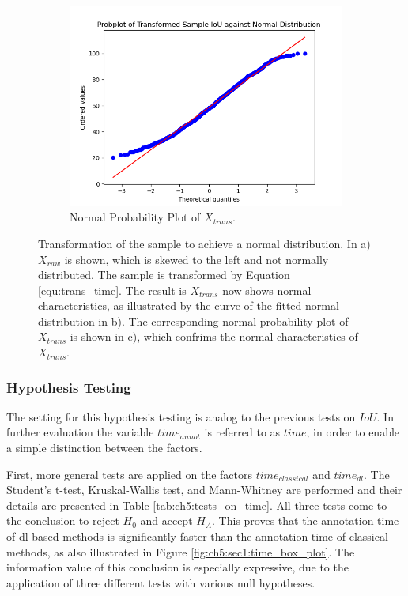 \begin{figure} [h]
	\hfill
	\begin{subfigure}[t]{0.3\textwidth}
		\centering
		\includegraphics[width=\textwidth]{figures/chap51_time_probplot.png}
		\caption{
			Normal Probability Plot of $X_{trans}$.
		}\label{fig:ch5:sec1:time_probplot}
	\end{subfigure}
	\caption[Time Sample Transformation]{
		Transformation of the sample to achieve a normal distribution.
		In a) $X_{raw}$ is shown, which is skewed to the left and not normally distributed.
		The sample is transformed by Equation \ref{equ:trans_time}.
		The result is $X_{trans}$ now shows normal characteristics, as illustrated by the curve of the fitted normal distribution in b).
		The corresponding normal probability plot of $X_{trans}$ is shown in c), which confrims the normal characteristics of $X_{trans}$.
	}\label{fig:ch5:sec1:time_transformation_iou}
\end{figure}




\subsubsection{Hypothesis Testing}

The setting for this hypothesis testing is analog to the previous tests on $IoU$.
In further evaluation the variable $time_{annot}$ is referred to as $time$, in order to enable a simple distinction between the factors.

First, more general tests are applied on the factors $time_{classical}$ and $time_{dl}$.
The Student's t-test, Kruskal-Wallis test, and Mann-Whitney are performed and their details are presented in Table \ref{tab:ch5:tests_on_time}.
All three tests come to the conclusion to reject $H_{0}$ and accept $H_{A}$.
This proves that the annotation time of \gls{dl} based methods is significantly faster than the annotation time of classical methods, as also illustrated in Figure \ref{fig:ch5:sec1:time_box_plot}.
The information value of this conclusion is especially expressive, due to the application of three different tests with various null hypotheses.

